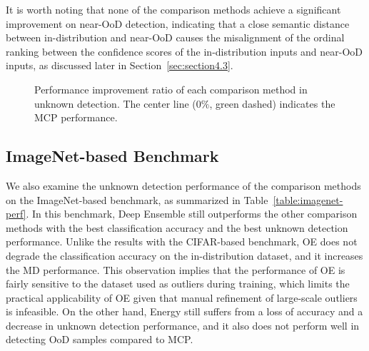 \documentclass[preprint,12pt]{elsarticle}
\begin{document}
It is worth noting that none of the comparison methods achieve a significant improvement on near-OoD detection, indicating that a close semantic distance between in-distribution and near-OoD causes the misalignment of the ordinal ranking between the confidence scores of the in-distribution inputs and near-OoD inputs, as discussed later in Section~\ref{sec:section4.3}.


\begin{figure*}[!t]
    \caption{Performance improvement ratio of each comparison method in unknown detection. The center line ($0\%$, green dashed) indicates the MCP performance.}
    \label{fig:aurc-barh}
\vskip -0.1in
\end{figure*}


\subsection{ImageNet-based Benchmark} \label{sec:section4.2}
We also examine the unknown detection performance of the comparison methods on the ImageNet-based benchmark, as summarized in Table~\ref{table:imagenet-perf}. In this benchmark, Deep Ensemble still outperforms the other comparison methods with the best classification accuracy and the best unknown detection performance. Unlike the results with the CIFAR-based benchmark, OE does not degrade the classification accuracy on the in-distribution dataset, and it increases the MD performance. This observation implies that the performance of OE is fairly sensitive to the dataset used as outliers during training, which limits the practical applicability of OE given that manual refinement of large-scale outliers is infeasible. On the other hand, Energy still suffers from a loss of accuracy and a decrease in unknown detection performance, and it also does not perform well in detecting OoD samples compared to MCP.
\end{document}
